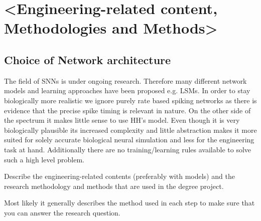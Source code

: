 \chapter{<Engineering-related content, Methodologies and Methods>}




\section{Choice of Network architecture}

The field of \acp{SNN} is under ongoing research. Therefore many different network models and learning approaches have been proposed e.g. \acp{LSM}\cite{dewolf_spiking_2016}. In order to stay biologically more realistic we ignore purely rate based spiking networks as there is evidence that the precise spike timing is relevant in nature\cite{brette_philosophy_2015}\cite{putney_precise_2019}.
On the other side of the spectrum it makes little sense to use \ac{HH}'s model. Even though it is very biologically plausible its increased complexity and little abstraction makes it more suited for solely accurate biological neural simulation and less for the engineering task at hand. Additionally there are no training/learning rules available to solve such a high level problem.\\




Describe the engineering-related contents (preferably with models) and the research methodology and methods that are used in the degree project.

Most likely it generally describes the method used in each step to make sure that you can answer the research question.


